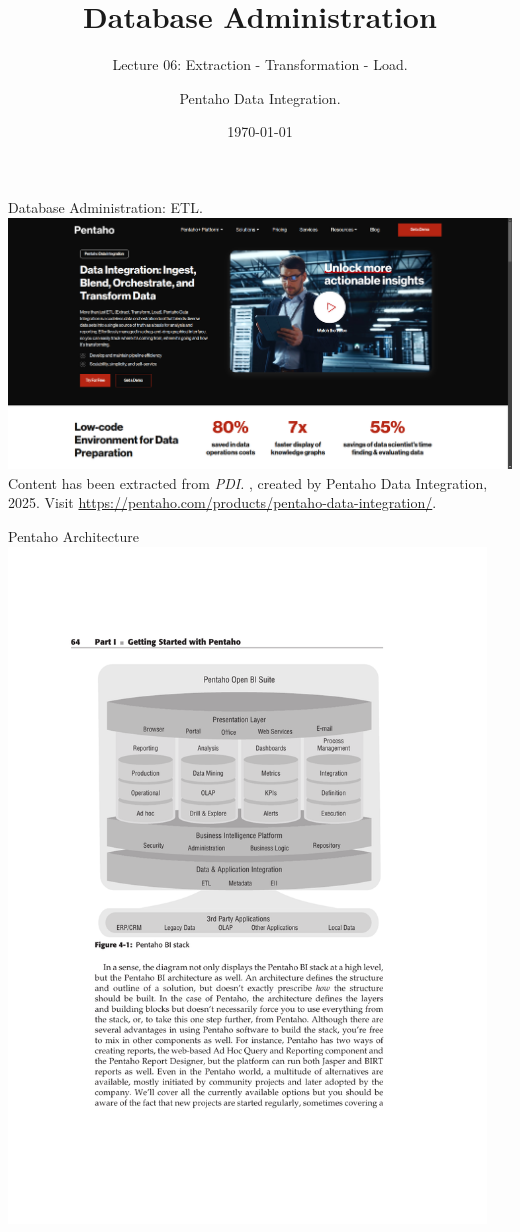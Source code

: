 \documentclass{beamer}
\title[ETL]{Database Administration}
\subtitle{Lecture 06: Extraction - Transformation - Load.}
\author{Pentaho Data Integration.}
\date{\today}
\begin{document}
\frame{\titlepage}

\begin{frame}{Database Administration: ETL.}
    \centering
    \includegraphics[width=\textwidth]{figures/pdi}\\
    \vspace{2mm}
    {
        \scriptsize
        Content has been extracted from \textit{PDI.} , created by Pentaho Data Integration, 2025.  Visit \url{https://pentaho.com/products/pentaho-data-integration/}.\\
    }
\end{frame}

\begin{frame}{Pentaho Architecture}
    \centering
    \includegraphics[width=0.95\textwidth, trim={3cm 12.5cm 3cm 5cm}, clip]{figures/pentaho_architecture}  %
\end{frame}
\end{document}
